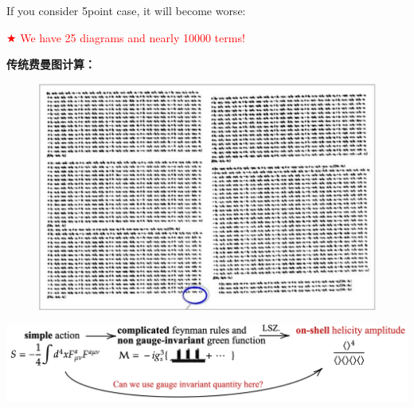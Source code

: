 \documentclass{beamer}
\begin{document}
\begin{frame}
If you consider 5point case, it will become worse:
\begin{center}
    \textcolor{red}{$\bigstar$ We have 25 diagrams and nearly 10000 terms!}
\end{center}
\vspace{-2em}

    \textbf{传统费曼图计算：}
    \begin{figure}
        \centering
        \includegraphics[width=0.5\linewidth]{5pt.png}
    \end{figure}
\vspace{-1.5em}
\pause
\begin{center}
\hspace*{-0.5em}\includegraphics[width=1.05\textwidth]{structure.png}
\end{center}

\end{frame}
\end{document}
